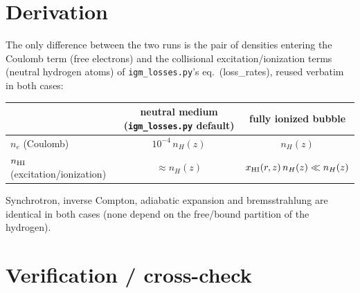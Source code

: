 \documentclass[11pt,a4paper]{article}
\begin{document}
\section{Derivation}
\label{sec:derivation}

The only difference between the two runs is the pair of densities entering the Coulomb term (free
electrons) and the collisional excitation/ionization terms (neutral hydrogen atoms) of
\texttt{igm\_losses.py}'s eq.~(loss\_rates), reused verbatim in both cases:
\begin{center}
\begin{tabular}{@{}lcc@{}}
\toprule
 & neutral medium (\texttt{igm\_losses.py} default) & fully ionized bubble \\
\midrule
$n_e$ (Coulomb) & $10^{-4}\,n_H(z)$ & $n_H(z)$ \\
$n_{\rm HI}$ (excitation/ionization) & $\approx n_H(z)$ & $x_{\rm HI}(r,z)\,n_H(z) \ll n_H(z)$ \\
\bottomrule
\end{tabular}
\end{center}
Synchrotron, inverse Compton, adiabatic expansion and bremsstrahlung are identical in both cases (none
depend on the free/bound partition of the hydrogen).

\section{Verification / cross-check}
\label{sec:verification}
\end{document}
